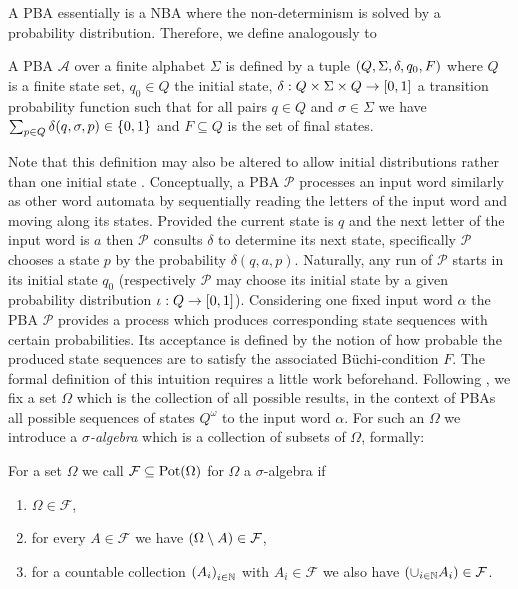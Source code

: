 A \ac{PBA} essentially is a \ac{NBA} where the non-determinism is solved by a 
probability distribution. Therefore, we define analogously to 
\cite{Groesser}
\begin{definition}
  A \acl{PBA} $\mathcal{A}$ over a finite alphabet $\Sigma$ is defined by a
  tuple $\left(Q, \Sigma, \delta, q_{0}, F\right)$ where $Q$ is a finite state set,
  $q_{0}\in Q$ the initial state,
    $\delta:Q\times\Sigma\times Q\rightarrow \left[0,1\right]$
  a transition probability function such that for all pairs $q\in Q$ and
  $\sigma\in\Sigma$ we have $\sum_{p\in Q}\delta(q,\sigma,p)\in\left\{0,1\right\}$
  and $F\subseteq Q$ is the set of final states.
\end{definition}
Note that this definition may also be altered to allow initial distributions
rather than one initial state \cite{RecOmeLangProbAuto}. Conceptually, a
\ac{PBA} $\mathcal{P}$ processes an input word similarly as other word automata
by sequentially reading the letters of the input word and moving along its
states. Provided the current state is $q$ and the next letter of the input word 
is $a$ then $\mathcal{P}$ consults $\delta$ to determine its next state,
specifically $\mathcal{P}$ chooses a state $p$ by the probability
$\delta(q,a,p)$. Naturally, any run of $\mathcal{P}$ starts in its initial
state $q_{0}$ (respectively $\mathcal{P}$ may choose its initial state by a
given probability distribution $\iota:Q\rightarrow\left[0,1\right]$). Considering
one fixed input word $\alpha$ the \ac{PBA} $\mathcal{P}$ provides a process
which produces corresponding state sequences with certain probabilities. Its
acceptance is defined by the notion of how probable the produced state 
sequences are to satisfy the associated Büchi-condition $F$. The formal
definition of this intuition requires a little work beforehand.
Following \cite{Groesser,Bauer}, we fix a set $\Omega$ which is the collection 
of all possible results, in the context of \acp{PBA} all possible sequences of
states $Q^{\omega}$ to the input word $\alpha$. 
For such an $\Omega$ we introduce a \emph{$\sigma$-algebra} which is a 
collection of subsets of $\Omega$, formally:
\begin{definition}
  For a set $\Omega$ we call $\mathcal{F}\subseteq\operatorname{Pot}(\Omega)$ for $\Omega$ a
  $\sigma$-algebra if
  \begin{enumerate}
    \item $\Omega\in\mathcal{F}$,
    \item for every $A\in\mathcal{F}$ we have $\left(\Omega\setminus A\right)
      \in\mathcal{F}$,
    \item for a countable collection $\left(A_{i}\right)_{i\in\mathbb{N}}$ with
      $A_{i}\in\mathcal{F}$ we also have $\left(\cup_{i\in\mathbb{N}}A_{i}\right)\in
      \mathcal{F}$.
  \end{enumerate}
\end{definition}
